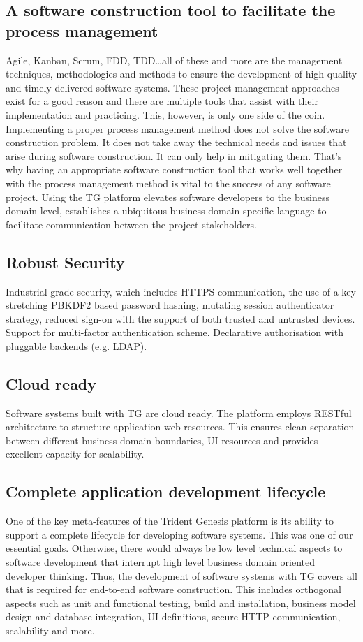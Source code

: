 \documentclass[a4paper,12pt,oneside,openright,final]{memoir} %
\begin{document}
	
\subsection*{A software construction tool to facilitate the process management}
	Agile, Kanban, Scrum, FDD, TDD\ldots all of these and more are the management techniques, methodologies and methods to ensure the development of high quality and timely delivered software systems.
	These project management approaches exist for a good reason and there are multiple tools that assist with their implementation and practicing.
	This, however, is only one side of the coin.
	Implementing a proper process management method does not solve the software construction problem.
	It does not take away the technical needs and issues that arise during software construction.
	It can only help in mitigating them.
	That's why having an appropriate software construction tool that works well together with the process management method is vital to the success of any software project.
	Using the TG platform elevates software developers to the business domain level, establishes a ubiquitous business domain specific language to facilitate communication between the project stakeholders.


\subsection*{Robust Security}
	Industrial grade security, which includes HTTPS communication, the use of a key stretching PBKDF2 based password hashing, mutating session authenticator strategy, reduced sign-on with the support of both trusted and untrusted devices. 
	Support for multi-factor authentication scheme. 
	Declarative authorisation with pluggable backends (e.g. LDAP).

    
    
\subsection*{Cloud ready}
	Software systems built with TG are cloud ready.
	The platform employs RESTful architecture to structure application web-resources.
	This ensures clean separation between different business domain boundaries, UI resources and provides excellent capacity for scalability.

\subsection*{Complete application development lifecycle}
	One of the key meta-features of the Trident Genesis platform is its ability to support a complete lifecycle for developing software systems.
	This was one of our essential goals.
	Otherwise, there would always be low level technical aspects to software development that interrupt high level business domain oriented developer thinking.
	Thus, the development of software systems with TG covers all that is required for end-to-end software construction.
	This includes orthogonal aspects such as unit and functional testing, build and installation, business model design and database integration, UI definitions, secure HTTP communication, scalability and more.
\end{document}

